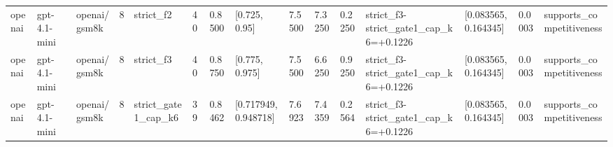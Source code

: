 \begin{tabular}{lllllllllllllll}
openai & gpt-4.1-mini & openai/gsm8k & 8 & strict\_f2 & 40 & 0.8500 & [0.725, 0.95] & 7.5500 & 7.3250 & 0.2250 & strict\_f3-strict\_gate1\_cap\_k6=+0.1226 & [0.083565, 0.164345] & 0.0003 & supports\_competitiveness \\
openai & gpt-4.1-mini & openai/gsm8k & 8 & strict\_f3 & 40 & 0.8750 & [0.775, 0.975] & 7.5500 & 6.6250 & 0.9250 & strict\_f3-strict\_gate1\_cap\_k6=+0.1226 & [0.083565, 0.164345] & 0.0003 & supports\_competitiveness \\
openai & gpt-4.1-mini & openai/gsm8k & 8 & strict\_gate1\_cap\_k6 & 39 & 0.8462 & [0.717949, 0.948718] & 7.6923 & 7.4359 & 0.2564 & strict\_f3-strict\_gate1\_cap\_k6=+0.1226 & [0.083565, 0.164345] & 0.0003 & supports\_competitiveness \\
\hline
\end{tabular}
